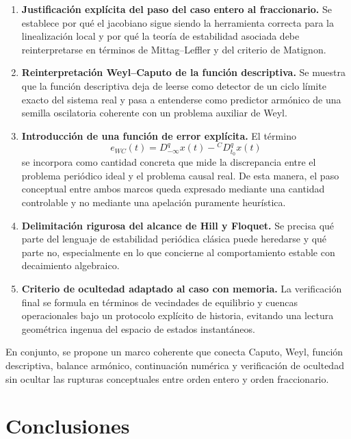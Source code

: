 \documentclass[journal]{IEEEtran}
\begin{document}
\begin{enumerate}
    \item \textbf{Justificación explícita del paso del caso entero al fraccionario.}
    Se establece por qué el jacobiano sigue siendo la herramienta correcta para la linealización local y por qué la teoría de estabilidad asociada debe reinterpretarse en términos de Mittag--Leffler y del criterio de Matignon.

    \item \textbf{Reinterpretación Weyl--Caputo de la función descriptiva.}
    Se muestra que la función descriptiva deja de leerse como detector de un ciclo límite exacto del sistema real y pasa a entenderse como predictor armónico de una semilla oscilatoria coherente con un problema auxiliar de Weyl.

    \item \textbf{Introducción de una función de error explícita.}
    El término
    \[
    e_{WC}(t)=D_{-\infty}^{q}x(t)-{}^{C}D_{t_0}^{q}x(t)
    \]
    se incorpora como cantidad concreta que mide la discrepancia entre el problema periódico ideal y el problema causal real. De esta manera, el paso conceptual entre ambos marcos queda expresado mediante una cantidad controlable y no mediante una apelación puramente heurística.

    \item \textbf{Delimitación rigurosa del alcance de Hill y Floquet.}
    Se precisa qué parte del lenguaje de estabilidad periódica clásica puede heredarse y qué parte no, especialmente en lo que concierne al comportamiento estable con decaimiento algebraico.

    \item \textbf{Criterio de ocultedad adaptado al caso con memoria.}
    La verificación final se formula en términos de vecindades de equilibrio y cuencas operacionales bajo un protocolo explícito de historia, evitando una lectura geométrica ingenua del espacio de estados instantáneos.
\end{enumerate}

En conjunto, se propone un marco coherente que conecta Caputo, Weyl, función descriptiva, balance armónico, continuación numérica y verificación de ocultedad sin ocultar las rupturas conceptuales entre orden entero y orden fraccionario.

\section{Conclusiones}
\end{document}
